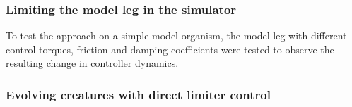 \documentclass[main]{subfiles}
\begin{document}

\subsubsection{Limiting the model leg in the simulator}

To test the approach on a simple model organism, the model leg with different control torques, friction and damping coefficients were tested to observe the resulting change in controller dynamics. 



\subsubsection{Evolving creatures with direct limiter control}


\end{document}
